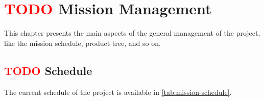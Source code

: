 %
%
%
%
%

%
%
%
%
%

\chapter{ \textcolor{red}{TODO} Mission Management} \label{ch:management}

This chapter presents the main aspects of the general management of the project, like the mission schedule, product tree, and so on.


\section{ \textcolor{red}{TODO} Schedule}

The current schedule of the project is available in \autoref{tab:mission-schedule}.


